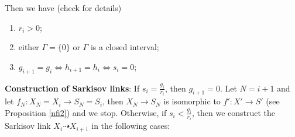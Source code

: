 \documentclass[11pt]{amsart}
\begin{document}
Then we have (check \cite[Lemma 4.4]{liuSarkisovProgramGeneralized2021} for details)
\begin{enumerate}
    \item $r_{i}>0$;
    \item either $\Gamma=\{0\} $ or $\Gamma$ is a closed interval;
    \item $g_{i+1}=g_{i} \Leftrightarrow h_{i+1}=h_{i} \Leftrightarrow s_{i}=0$;
\end{enumerate}
\textbf{Construction of Sarkisov links}\label{Construction}: If $s_{i}=\frac{g_{i}}{r_{i}}$, then $g_{i+1}=0$. Let $N=i+1$  and let $f_{N}:X_{N}=X_{i} \to S_{N}=S_{i}$, then $X_{N}\to S_{N}$ is isomorphic to $f':X'\to S'$ (see Proposition \ref{nfi2}) and  we stop. Otherwise, if  $s_{i}<\frac{g_{i}}{r_{i}}$, then we construct the Sarkisov link $X_{i}\dashrightarrow X_{i+1}$ in the following cases:
\end{document}
